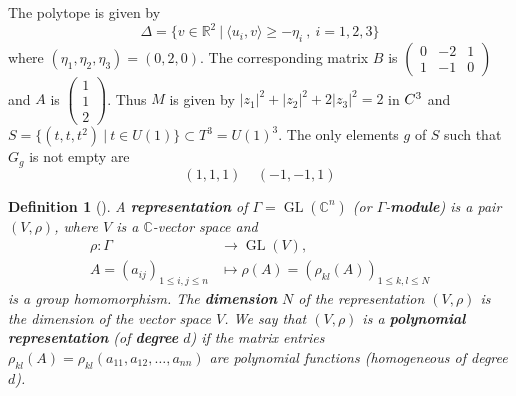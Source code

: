 \documentclass{article}
\newtheorem{defn}[theorem]{Definition\rm}
\newcommand{\lra}{\longrightarrow}
\newcommand{\RR}{\mathbb{R}}
\newcommand{\CC}{\mathbb{C}}
\newcommand{\pbrackets}[1]{\left( #1 \right)}
\DeclareMathOperator{\GL}{GL}
\begin{document}
	
	The polytope is given by $$\Delta=\{v \in \RR^2 \ |\ \langle u_i, v \rangle \geq -\eta_i\ ,\ i=1,2,3 \}$$ where $(\eta_1,\eta_2,\eta_3)=(0,2,0)$. The corresponding matrix $B$ is {\small $\left(\begin{array}{ccc} 0&-2&1 \\ 1&-1&0 \end{array}\right)$} and $A$ is {\small $\left(\begin{array}{c} 1\\ 1\\2 \end{array}\right)$}. Thus $M$ is given by $|z_1|^2 + |z_2|^2 + 2|z_3|^2=2$ in $\\C^3$ and $S = \{(t,t,t^2) \ |\ t \in U(1)\} \subset T^{3} = U(1)^3$. The only elements $g$ of $S$ such that $G_g$ is not empty are
	\[
	(1,1,1) \ \ \ \ \ (-1,-1,1)
	\]
	
	\begin{defn}[\cite{Sturmfels2008}]
		A \textbf{representation} of $\Gamma = \GL(\CC^{n})$ (or $\Gamma$-\textbf{module}) is a pair $(V, \rho)$, where $V$ is a $\CC$-vector space and
		\begin{equation*}
			\begin{split}
				\rho : \Gamma &\lra \GL(V), \\
				A = (a_{ij})_{1 \leq i,j \leq n} &\longmapsto \rho(A) = \pbrackets{\rho_{kl}(A)}_{1 \leq k, l \leq N}
			\end{split}
		\end{equation*}
		is a group homomorphism. The \textbf{dimension} $N$ of the representation $(V, \rho)$ is the dimension of the vector space $V$. We say that $(V, \rho)$ is a \textbf{polynomial representation} (of \textbf{degree} $d$) if the matrix entries $\rho_{kl}(A) = \rho_{kl}(a_{11}, a_{12}, \ldots, a_{nn})$ are polynomial functions (homogeneous of degree $d$).
	\end{defn}
	
\end{document}

